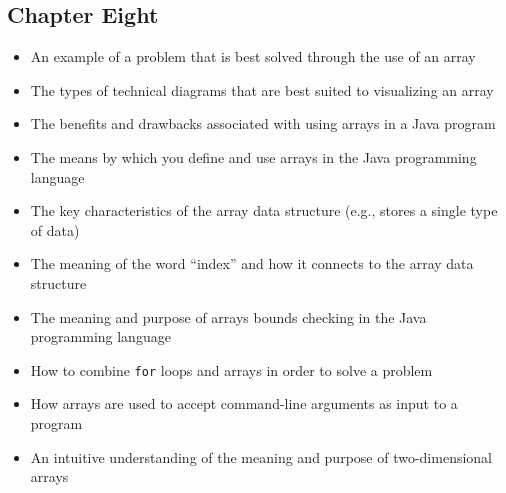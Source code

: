 \documentclass[11pt]{article}
\begin{document}
\subsection*{Chapter Eight}

\begin{itemize}

  \itemsep -.015in
  \item An example of a problem that is best solved through the use of an array
  \item The types of technical diagrams that are best suited to visualizing an array
  \item The benefits and drawbacks associated with using arrays in a Java program
  \item The means by which you define and use arrays in the Java programming language
  \item The key characteristics of the array data structure (e.g., stores a single type of data)
  \item The meaning of the word ``index'' and how it connects to the array data structure
  \item The meaning and purpose of arrays bounds checking in the Java programming language
  \item How to combine {\tt for} loops and arrays in order to solve a problem
  \item How arrays are used to accept command-line arguments as input to a program
  \item An intuitive understanding of the meaning and purpose of two-dimensional arrays

\end{itemize}
\end{document}
